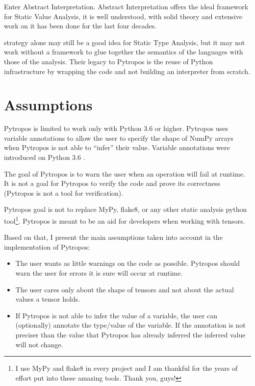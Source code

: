 Enter Abstract Interpretation. Abstract Interpretation offers the ideal
framework for Static Value Analysis, it is well understood, with solid
theory and extensive work on it has been done for the last four decades.

\textcite{ortin_towards_2015} strategy alone may still be a good idea
for Static Type Analysis, but it may not work without a framework to
glue together the semantics of the languages with those of the analysis.
Their legacy to Pytropos is the reuse of Python infrastructure by
wrapping the code and not building an interpreter from scratch.

\section{Assumptions}\label{assumptions}

Pytropos is limited to work only with Python 3.6 or higher. Pytropos
uses variable annotations to allow the user to specify the shape of
NumPy arrays when Pytropos is not able to \enquote{infer} their value.
Variable annotations were introduced on Python 3.6 \autocite{pep526}.

The goal of Pytropos is to warn the user when an operation will fail at
runtime. It is not a goal for Pytropos to verify the code and prove its
correctness (Pytropos is not a tool for verification).

Pytropos goal is not to replace MyPy, flake8, or any other static
analysis python tool\footnote{I use MyPy and flake8 in every project and
  I am thankful for the years of effort put into these amazing tools.
  Thank you, guys!}. Pytropos is meant to be an aid for developers when
working with tensors.

Based on that, I present the main assumptions taken into account in the
implementation of Pytropos:

\begin{itemize}
\tightlist
\item
  The user wants as little warnings on the code as possible. Pytropos
  should warn the user for errors it is sure will occur at runtime.
\item
  The user cares only about the shape of tensors and not about the
  actual values a tensor holds.
\item
  If Pytropos is not able to infer the value of a variable, the user can
  (optionally) annotate the type/value of the variable. If the
  annotation is not preciser than the value that Pytropos has already
  inferred the inferred value will not change.
\end{itemize}

